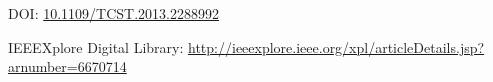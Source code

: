 \documentclass[a4paper,12pt]{article}
\newcommand{\doi}[1]{DOI: \href{https://doi.org/#1}{#1}}
\begin{document}
\thispagestyle{empty}

\vspace{3cm}

\nocite{FDB-art-25}
\printbibliography

\vspace{3cm}
\doi{10.1109/TCST.2013.2288992}

\vspace{1.5cm}
IEEEXplore Digital Library:
\url{http://ieeexplore.ieee.org/xpl/articleDetails.jsp?arnumber=6670714}

\newpage

\end{document}
